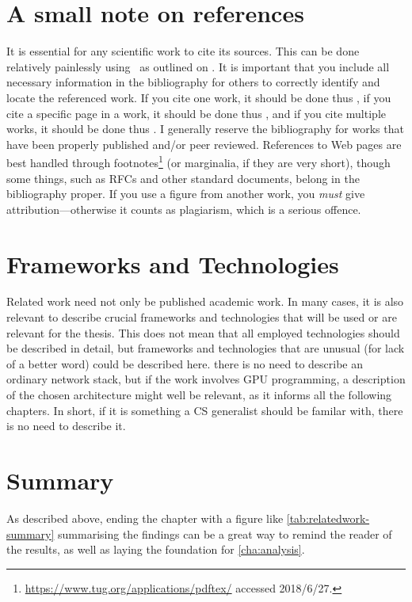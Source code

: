 \section{A small note on references}
\label{sec:small-note-refer}

It is essential for any scientific work to cite its sources. This can be done
relatively painlessly using \mBibTeX\ as outlined on
. It is important that you include all necessary
information in the bibliography for others to correctly identify and locate
the referenced work. If you cite one work, it should be done thus
\cite{Kristensen2010:MP2P2010}, if you cite a specific page in a work, it
should be done thus \cite[p. 410]{Chawathe2003:2003}, and if you cite multiple
works, it should be done thus
\cite{knuth:1976,knuth:1974,Kristensen2010:MP2P2010,Mittelbach2004:TLC2004}.
I generally reserve the bibliography for works that have been properly
published and/or peer reviewed. References to Web pages are best handled
through footnotes\footnote{\url{https://www.tug.org/applications/pdftex/}
  accessed 2018/6/27.} (or marginalia, if they are very
short), though some things, such
as RFCs and other standard documents, belong in the bibliography proper. If
you use a figure from another work, you \emph{must} give attribution---otherwise
it counts as plagiarism, which is a serious offence.


\section{Frameworks and Technologies}
\label{sec:fram-techn}

Related work need not only be published academic work. In many cases, it is
also relevant to describe crucial frameworks and technologies that will be
used or are relevant for the thesis.  This does not mean that all employed
technologies should be described in detail, but frameworks and technologies
that are unusual (for lack of a better word) could be described here. \Eg
there is no need to describe an ordinary network stack, but if the work
involves GPU programming, a description of the chosen architecture might well
be relevant, as it informs all the following chapters.  In short, if it is
something a CS generalist should be familar with, there is no need to describe
it.

\section{Summary}
\label{sec:summary}
As described above, ending the chapter with a figure like
\autoref{tab:relatedwork-summary} summarising the findings can be a great way
to remind the reader of the results, as well as laying the foundation for
\autoref{cha:analysis}.


